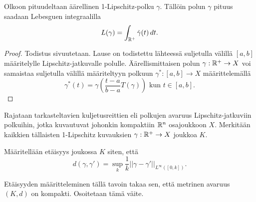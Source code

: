 \documentclass[12pt,oneside,a4paper]{amsbook} %
\begin{document}
\begin{theorem}
    Olkoon pituudeltaan äärellinen 1-Lipschitz-polku $\gamma$. Tällöin polun $\gamma$ pituus saadaan Lebesguen integraalilla
    \begin{equation*}
        L(\gamma) = \int_{\mathbb{R}^{+}} \dot \gamma(t) \, dt.
    \end{equation*}
\end{theorem}
\begin{proof}
    Todistus sivuutetaan. Lause on todistettu lähteessä \cite[s. 57] {burago} suljetulla välillä $[a, b]$ määritelylle Lipschitz-jatkuvalle polulle. Äärellismittaisen polun $\gamma:{\mathbb{R}^{+}} \to X$ voi samaistaa suljetulla välillä määriteltyyn polkuun $\gamma^*:[a,b] \to X$ määrittelemällä 
    \begin{equation*}
        \gamma^*(t) =  \gamma\left(\frac{t-a}{b-a}T(\gamma)\right) \text{ kun } t \in [a, b].
    \end{equation*}
\end{proof}


Rajataan tarkasteltavien kuljetusreittien eli polkujen avaruus
Lipschitz-jatkuviin polkuihin, jotka kuvautuvat johonkin kompaktiin $\mathbb{R}^n$ osajoukkoon $X$. Merkitään kaikkien tällaisten 1-Lipschitz kuvauksien $\gamma: {\mathbb{R}^{+}} \to X$  joukkoa $K$. 

\begin{definition}
    Määritellään etäisyys joukossa $K$ siten, että
    \[d(\gamma, \gamma') = \sup_k \frac{1}{k}||\gamma - \gamma'||_{L^\infty([0,k])}.\]
\end{definition}

Etäisyyden määritteleminen tällä tavoin takaa sen, että metrinen avaruus $(K, d)$ on kompakti. Osoitetaan tämä väite.
\end{document}
